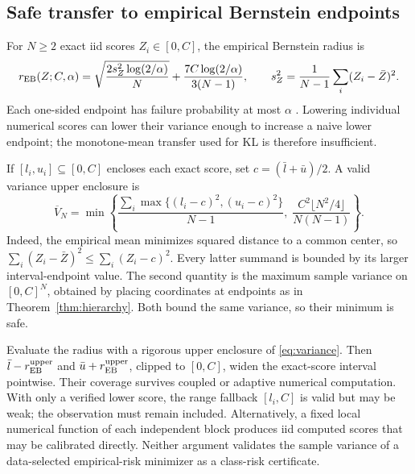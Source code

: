 \subsection{Safe transfer to empirical Bernstein endpoints}

For $N\geq2$ exact iid scores $Z_i\in[0,C]$, the empirical Bernstein
radius is
\[
 r_{\rm EB}(Z;C,\alpha)
 =\sqrt{\frac{2s_Z^2\log(2/\alpha)}N}
       +\frac{7C\log(2/\alpha)}{3(N-1)},
 \qquad s_Z^2=\frac1{N-1}\sum_i(Z_i-\bar Z)^2.
\]
Each one-sided endpoint has failure probability at most $\alpha$
\citep[Theorem~4]{maurer2009empirical}. Lowering individual numerical
scores can lower their variance enough to increase a naive lower endpoint;
the monotone-mean transfer used for KL is therefore insufficient.

If $[l_i,u_i]\subseteq[0,C]$ encloses each exact score, set
$c=(\bar l+\bar u)/2$. A valid variance upper enclosure is
\begin{equation}
 \overline V_N=
 \min\left\{
  \frac{\sum_i\max\{(l_i-c)^2,(u_i-c)^2\}}{N-1},\;
  \frac{C^2\lfloor N^2/4\rfloor}{N(N-1)}\right\}.
 \label{eq:variance}
\end{equation}
Indeed, the empirical mean minimizes squared distance to a common center,
so $\sum_i(Z_i-\bar Z)^2\leq\sum_i(Z_i-c)^2$. Every latter summand is
bounded by its larger interval-endpoint value. The second quantity is the
maximum sample variance on $[0,C]^N$, obtained by placing coordinates at
endpoints as in Theorem~\ref{thm:hierarchy}. Both bound the same
variance, so their minimum is safe.

Evaluate the radius with a rigorous upper enclosure of
\eqref{eq:variance}. Then $\bar l-r_{\rm EB}^{\rm upper}$ and
$\bar u+r_{\rm EB}^{\rm upper}$, clipped to $[0,C]$, widen the exact-score
interval pointwise. Their coverage survives coupled or adaptive numerical
computation. With only a verified lower score, the range fallback
$[l_i,C]$ is valid but may be weak; the observation must remain included.
Alternatively, a fixed local numerical function of each independent block
produces iid computed scores that may be calibrated directly. Neither
argument validates the sample variance of a data-selected empirical-risk
minimizer as a class-risk certificate.
